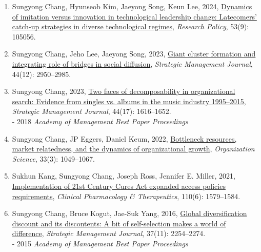 \documentclass[11pt]{article}
\newenvironment{pubs}
  {\begin{enumerate}[label={(\arabic*)},leftmargin=1.9em,labelsep=0.5em,
     align=left,itemsep=5pt,topsep=3pt]}
  {\end{enumerate}}
\begin{document}
\begin{pubs}
\item Sungyong Chang, Hyunseob Kim, Jaeyong Song, Keun Lee, 2024, \href{https://www.sciencedirect.com/science/article/pii/S0048733324001057?dgcid=author}{Dynamics of imitation versus innovation in technological leadership change: Latecomers' catch-up strategies in diverse technological regimes}, \textit{Research Policy}, 53(9): 105056.
\item Sungyong Chang, Jeho Lee, Jaeyong Song, 2023, \href{http://doi.org/10.1002/smj.3527}{Giant cluster formation and integrating role of bridges in social diffusion}, \textit{Strategic Management Journal}, 44(12): 2950--2985.
\item Sungyong Chang, 2023, \href{https://onlinelibrary.wiley.com/doi/10.1002/smj.3479}{Two faces of decomposability in organizational search: Evidence from singles vs. albums in the music industry 1995--2015}, \textit{Strategic Management Journal}, 44(17): 1616--1652.\\
{\color{softgray}\footnotesize - 2018 \textit{Academy of Management Best Paper Proceedings}}
\item Sungyong Chang, JP Eggers, Daniel Keum, 2022, \href{https://pubsonline.informs.org/doi/pdf/10.1287/orsc.2021.1479}{Bottleneck resources, market relatedness, and the dynamics of organizational growth}, \textit{Organization Science}, 33(3): 1049--1067.
\item Sukhun Kang, Sungyong Chang, Joseph Ross, Jennifer E. Miller, 2021, \href{https://doi.org/10.1002/cpt.2401}{Implementation of 21st Century Cures Act expanded access policies requirements}, \textit{Clinical Pharmacology \& Therapeutics}, 110(6): 1579--1584.
\item Sungyong Chang, Bruce Kogut, Jae-Suk Yang, 2016, \href{http://onlinelibrary.wiley.com/doi/10.1002/smj.2574/full}{Global diversification discount and its discontents: A bit of self-selection makes a world of difference}, \textit{Strategic Management Journal}, 37(11): 2254--2274.\\
{\color{softgray}\footnotesize - 2015 \textit{Academy of Management Best Paper Proceedings}}
\end{pubs}
\end{document}
